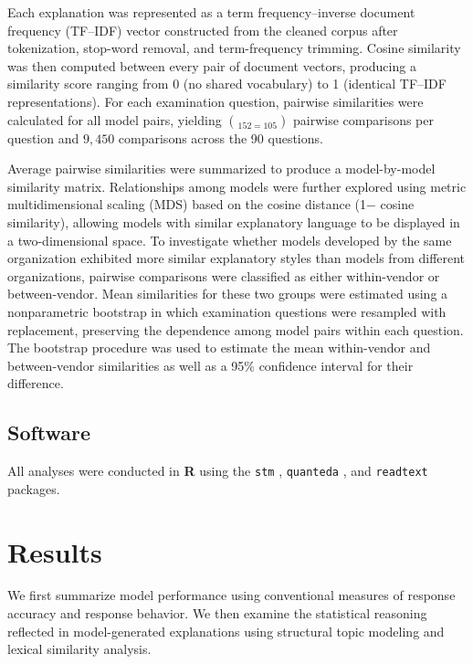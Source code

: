 \documentclass[APA,LATO2COL]{WileyNJDv5}
\newcommand{\proglang}[1]{\textbf{#1}}
\newcommand{\pkg}[1]{\texttt{#1}}
\begin{document}
Each explanation was represented as a term frequency–inverse document frequency (TF–IDF) vector constructed from the cleaned corpus after tokenization, stop-word removal, and term-frequency trimming. Cosine similarity was then computed between every pair of document vectors, producing a similarity score ranging from 0 (no shared vocabulary) to 1 (identical TF–IDF representations). For each examination question, pairwise similarities were calculated for all model pairs, yielding $\choose{15}{2} = 105$ pairwise comparisons per question and $9,450$ comparisons across the 90 questions.

Average pairwise similarities were summarized to produce a model-by-model similarity matrix. Relationships among models were further explored using metric multidimensional scaling (MDS) based on the cosine distance (1− cosine similarity), allowing models with similar explanatory language to be displayed in a two-dimensional space. To investigate whether models developed by the same organization exhibited more similar explanatory styles than models from different organizations, pairwise comparisons were classified as either within-vendor or between-vendor. Mean similarities for these two groups were estimated using a nonparametric bootstrap in which examination questions were resampled with replacement, preserving the dependence among model pairs within each question. The bootstrap procedure was used to estimate the mean within-vendor and between-vendor similarities as well as a 95\% confidence interval for their difference.

\subsection{Software}
\label{sec:software}

All analyses were conducted in \proglang{R} \cite[version 4.6.0]{rcore}
using the \pkg{stm} \cite{roberts2019}, \pkg{quanteda} \cite{quanteda},
and \pkg{readtext} \cite{readtext} packages. 


\section{Results}\label{sec:results}

We first summarize model performance using conventional measures of response accuracy and response behavior. We then examine the statistical reasoning reflected in model-generated explanations using structural topic modeling and lexical similarity analysis.
\end{document}
